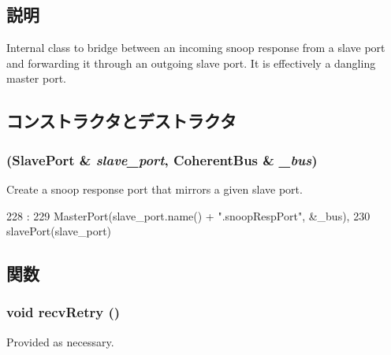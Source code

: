 \subsection{説明}
Internal class to bridge between an incoming snoop response from a slave port and forwarding it through an outgoing slave port. It is effectively a dangling master port. 

\subsection{コンストラクタとデストラクタ}
\hypertarget{classCoherentBus_1_1SnoopRespPort_ac24e511efb0df65ac078ae0d4bde34b2}{
\subsubsection[{SnoopRespPort}]{ ({\bf SlavePort} \& {\em slave\_\-port}, \/  {\bf CoherentBus} \& {\em \_\-bus})}}
\label{classCoherentBus_1_1SnoopRespPort_ac24e511efb0df65ac078ae0d4bde34b2}
Create a snoop response port that mirrors a given slave port. 


\begin{DoxyCode}
228                                                                 :
229             MasterPort(slave_port.name() + ".snoopRespPort", &_bus),
230             slavePort(slave_port) { }

\end{DoxyCode}


\subsection{関数}
\hypertarget{classCoherentBus_1_1SnoopRespPort_a29cb5a4f98063ce6e9210eacbdb35298}{
\subsubsection[{recvRetry}]{\setlength{\rightskip}{0pt plus 5cm}void recvRetry ()}}
\label{classCoherentBus_1_1SnoopRespPort_a29cb5a4f98063ce6e9210eacbdb35298}
Provided as necessary. 

